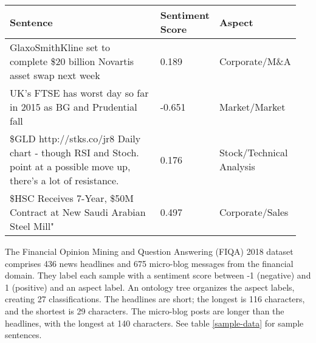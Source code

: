 \renewcommand{\arraystretch}{1.5}
\begin{table*}
    \small
    \caption{Sample FIQA 2018 Data}
    \label{sample-data}
    \centering
    \begin{tabular}{p{0.65\linewidth} | p{0.09\linewidth} | p{0.21\linewidth}}
        \toprule
        Sentence     & Sentiment Score     & Aspect \\
        \midrule
        GlaxoSmithKline set to complete \$20 billion Novartis asset swap next week                                                 & 0.189  & Corporate/M\&A           \\
        UK's FTSE has worst day so far in 2015 as BG and Prudential fall                                                           & -0.651 & Market/Market            \\
        \$GLD http://stks.co/jr8 Daily chart - though RSI and Stoch. point at a possible move up, there's a lot of resistance.     & 0.176  & Stock/Technical Analysis \\
        \$HSC Receives 7-Year, \$50M Contract at New Saudi Arabian Steel Mill"                                                     & 0.497  & Corporate/Sales          \\
        \bottomrule
    \end{tabular}
\end{table*}

The Financial Opinion Mining and Question Answering (FIQA) 2018 dataset \citep{10.1145/3184558.3192301} comprises 436 news headlines and 675 micro-blog messages from the financial domain. They label each sample with a sentiment score between -1 (negative) and 1 (positive) and an aspect label. An ontology tree organizes the aspect labels, creating 27 classifications. The headlines are short; the longest is 116 characters, and the shortest is 29 characters. The micro-blog posts are longer than the headlines, with the longest at 140 characters. See table \ref{sample-data} for sample sentences.
